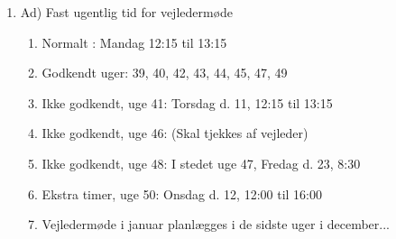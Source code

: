 \documentclass[12pt]{article}
\begin{document}
\begin{enumerate}
    \item Ad) Fast ugentlig tid for vejledermøde
    \begin{enumerate}
        \item Normalt : Mandag 12:15 til 13:15 
        \item Godkendt uger: 39, 40, 42, 43, 44, 45, 47, 49
        \item Ikke godkendt, uge 41:  Torsdag d. 11, 12:15 til 13:15 
        \item Ikke godkendt, uge 46:  (Skal tjekkes af vejleder) 
        \item Ikke godkendt, uge 48:  I stedet uge 47, Fredag d. 23, 8:30 
        \item Ekstra timer,  uge 50:  Onsdag d. 12, 12:00 til 16:00   
        \item Vejledermøde i januar planlægges i de sidste uger i december...
    \end{enumerate}

    
 \end{enumerate}
\end{document}
